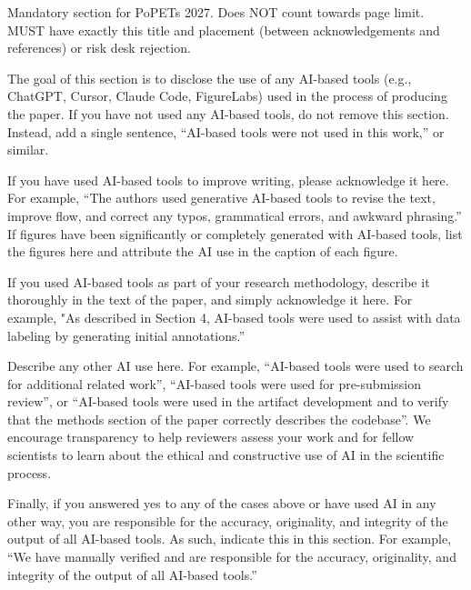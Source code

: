 \documentclass[sigconf,anonymous,review]{acmart}
\begin{document}
\begin{ai}
Mandatory section for PoPETs 2027. Does NOT count towards page limit. MUST have
exactly this title and placement (between acknowledgements and references) or
risk desk rejection.

The goal of this section is to disclose the use of any AI-based tools (e.g.,
ChatGPT, Cursor, Claude Code, FigureLabs) used in the process of producing the
paper. If you have not used any AI-based tools, do not remove this section.
Instead, add a single sentence, ``AI-based tools were not used in this work,''
or similar. 

If you have used AI-based tools to improve writing, please acknowledge it here.
For example, ``The authors used generative AI-based tools to revise the text,
improve flow, and correct any typos, grammatical errors, and awkward phrasing.''
If figures have been significantly or completely generated with AI-based tools,
list the figures here and attribute the AI use in the caption of each figure.

If you used AI-based tools as part of your research methodology, describe it
thoroughly in the text of the paper, and simply acknowledge it here. For
example, "As described in Section 4, AI-based tools were used to assist with
data labeling by generating initial annotations.''

Describe any other AI use here. For example, ``AI-based tools were used to
search for additional related work'', ``AI-based tools were used for
pre-submission review'', or ``AI-based tools were used in the artifact
development and to verify that the methods section of the paper correctly
describes the codebase''. We encourage transparency to help reviewers assess
your work and for fellow scientists to learn about the ethical and constructive
use of AI in the scientific process.

Finally, if you answered yes to any of the cases above or have used AI in any
other way, you are responsible for the accuracy, originality, and integrity of
the output of all AI-based tools. As such, indicate this in this section. For
example, ``We have manually verified and are responsible for the accuracy,
originality, and integrity of the output of all AI-based tools.''
\end{ai}



\end{document}
